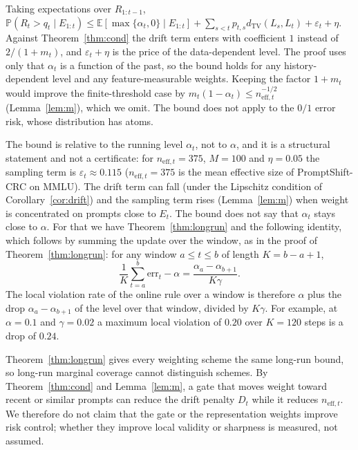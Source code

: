 Taking expectations over $R_{1:t-1}$, $\mathbb P(R_t>q_t\mid E_{1:t})\le\mathbb E[\max\{\alpha_t,0\}\mid E_{1:t}]+\sum_{s<t}p_{t,s}d_{\mathrm{TV}}(L_s,L_t)+\varepsilon_t+\eta$. Against Theorem~\ref{thm:cond} the drift term enters with coefficient $1$ instead of $2/(1+m_t)$, and $\varepsilon_t+\eta$ is the price of the data-dependent level. The proof uses only that $\alpha_t$ is a function of the past, so the bound holds for any history-dependent level and any feature-measurable weights. Keeping the factor $1+m_t$ would improve the finite-threshold case by $m_t(1-\alpha_t)\le n_{\mathrm{eff},t}^{-1/2}$ (Lemma~\ref{lem:m}), which we omit. The bound does not apply to the $0/1$ error risk, whose distribution has atoms.

\begin{remark}\label{rem:running}
The bound is relative to the running level $\alpha_t$, not to $\alpha$, and it is a structural statement and not a certificate: for $n_{\mathrm{eff},t}=375$, $M=100$ and $\eta=0.05$ the sampling term is $\varepsilon_t\approx 0.115$ ($n_{\mathrm{eff},t}=375$ is the mean effective size of PromptShift-CRC on MMLU). The drift term can fall (under the Lipschitz condition of Corollary~\ref{cor:drift}) and the sampling term rises (Lemma~\ref{lem:m}) when weight is concentrated on prompts close to $E_t$. The bound does not say that $\alpha_t$ stays close to $\alpha$. For that we have Theorem~\ref{thm:longrun} and the following identity, which follows by summing the update over the window, as in the proof of Theorem~\ref{thm:longrun}: for any window $a\le t\le b$ of length $K=b-a+1$,
\[
 \frac1K\sum_{t=a}^{b}\mathrm{err}_t-\alpha=\frac{\alpha_a-\alpha_{b+1}}{K\gamma}.
\]
The local violation rate of the online rule over a window is therefore $\alpha$ plus the drop $\alpha_a-\alpha_{b+1}$ of the level over that window, divided by $K\gamma$. For example, at $\alpha=0.1$ and $\gamma=0.02$ a maximum local violation of $0.20$ over $K=120$ steps is a drop of $0.24$.
\end{remark}

\begin{remark}\label{rem:gate}
Theorem~\ref{thm:longrun} gives every weighting scheme the same long-run bound, so long-run marginal coverage cannot distinguish schemes.
By Theorem~\ref{thm:cond} and Lemma~\ref{lem:m}, a gate that moves weight toward recent or similar prompts can reduce the drift penalty
$D_t$ while it reduces $n_{\mathrm{eff},t}$. We therefore do not claim that the gate or the representation weights improve
risk control; whether they improve local validity or sharpness is measured, not assumed.
\end{remark}
